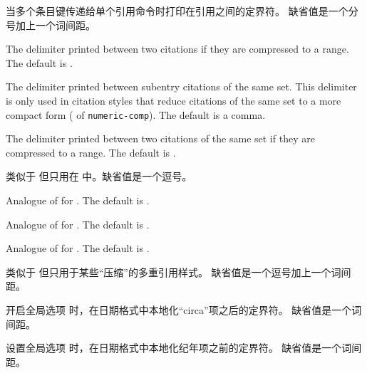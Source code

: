 \begin{ltxsyntax}
当多个条目键传递给单个引用命令时打印在引用之间的定界符。
缺省值是一个分号加上一个词间距。

The delimiter printed between two citations if they are compressed to a range. The default is .

The delimiter printed between subentry citations of the same set. This delimiter is only used in citation styles that reduce citations of the same set to a more compact form ( of \texttt{numeric-comp}). The default is a comma.

The delimiter printed between two citations of the same set if they are compressed to a range. The default is .

类似于  但只用在  中。缺省值是一个逗号。


Analogue of  for . The default is .

Analogue of  for . The default is .

Analogue of  for . The default is .


类似于  但只用于某些“压缩”的多重引用样式。
缺省值是一个逗号加上一个词间距。

\CSdelimMark
开启全局选项  时，在日期格式中本地化“circa”项之后的定界符。
缺省值是一个词间距。

\CSdelimMark
设置全局选项  时，在日期格式中本地化纪年项之前的定界符。
缺省值是一个词间距。


\end{ltxsyntax}
